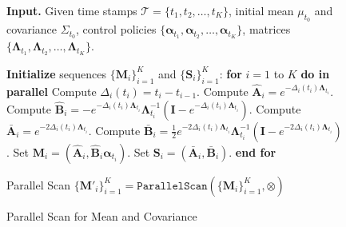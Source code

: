 \begin{figure}[!t]
\begin{minipage}[t]{0.54\textwidth}
\begin{algorithm}[H]
\caption{Parallel Scan for Mean and Covariance}\label{alg:parallel_scan}
\begin{algorithmic}[1]
\STATE \textbf{Input. } Given time stamps $\mathcal{T} = \{t_1, t_2, \ldots, t_K\}$, initial mean $\mu_{t_0}$ and covariance $\Sigma_{t_0}$, control policies $\{\mathbf{\alpha}_{t_1}, \mathbf{\alpha}_{t_2}, \ldots, \mathbf{\alpha}_{t_K}\}$, matrices $\{\mathbf{\Lambda}_{t_1}, \mathbf{\Lambda}_{t_2}, \ldots, \mathbf{\Lambda}_{t_K}\}$.

    
\STATE \textbf{Initialize} sequences $\{\mathbf{M}_i\}_{i=1}^K$ and $\{\mathbf{S}_i\}_{i=1}^K$:
    \STATE \textbf{for} $i = 1$ to $K$ \textbf{do in parallel}
        \STATE \hspace{2mm} Compute $\Delta_{i}(t_i) = t_i - t_{i-1}$.
        \STATE \hspace{2mm} Compute $\hat{\mathbf{A}}_{i} = e^{-\Delta_{i}(t_i)\mathbf{\Lambda}_{t_i}}$.
        \STATE \hspace{2mm} Compute $\hat{\mathbf{B}}_{i} = - e^{-\Delta_{i}(t_i)\mathbf{\Lambda}_{t_i}} \mathbf{\Lambda}_{t_i}^{-1} \left( \mathbf{I} - e^{-\Delta_{i}(t_i)\mathbf{\Lambda}_{t_i}} \right)$.
        \STATE \hspace{2mm} Compute $\bar{\mathbf{A}}_{i} = e^{-2\Delta_{i}(t_i)\mathbf{\Lambda}_{t_i}}$.
        \STATE \hspace{2mm} Compute $\bar{\mathbf{B}}_{i} = \frac{1}{2} e^{-2\Delta_{i}(t_i)\mathbf{\Lambda}_{t_i}} \mathbf{\Lambda}_{t_i}^{-1} \left( \mathbf{I} - e^{-2\Delta_{i}(t_i)\mathbf{\Lambda}_{t_i}} \right)$.
        \STATE \hspace{2mm} Set $\mathbf{M}_i = \left(\hat{\mathbf{A}}_{i}, \hat{\mathbf{B}}_{i} \mathbf{\alpha}_{t_i}\right)$.
        \STATE \hspace{2mm} Set $\mathbf{S}_i = \left(\bar{\mathbf{A}}_{i}, \bar{\mathbf{B}}_{i}\right)$.
    \STATE \textbf{end for}

    \STATE Parallel Scan $\{\mathbf{M}'_i\}_{i=1}^K = \texttt{ParallelScan}(\{\mathbf{M}_i\}_{i=1}^K, \otimes)$


\end{algorithmic}
\end{algorithm}
\end{minipage}
\end{figure}

